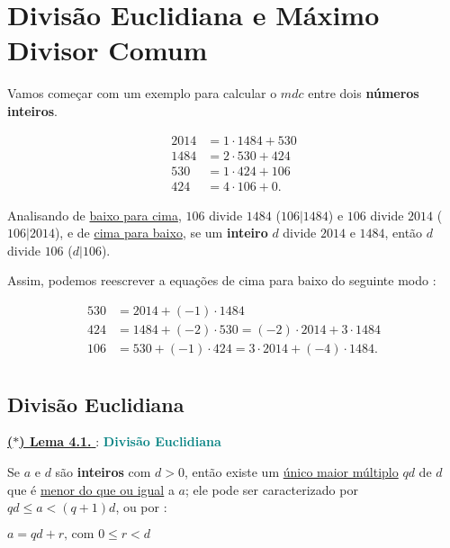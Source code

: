 \section*{Divisão Euclidiana e Máximo Divisor Comum}

Vamos começar com um exemplo para calcular o $mdc$ entre dois \textbf{números inteiros}.

\begin{exemplo}[: {$mdc(2014,1486) = 106$}]
\[
\begin{aligned}
    2014 &= 1 \cdot 1484 + 530 \\
    1484 &= 2 \cdot 530 + 424 \\
    530 &= 1 \cdot 424 + 106 \\
    424 &= 4 \cdot 106 + 0.
\end{aligned}
\]
\end{exemplo}

\noindent Analisando de \underline{baixo para cima}, $106$ divide $1484$ ($106|1484$) e $106$ divide $2014$ 
($106|2014$), e de \underline{cima para baixo}, se um \textbf{inteiro} $d$ divide $2014$ e $1484$, então $d$ divide $106$ ($d|106$).

\vspace{0.05cm}
\noindent Assim, podemos reescrever a equações de cima para baixo do seguinte modo : 

\begin{align*}
    530 &= 2014 + (-1) \cdot 1484 \\
    424 &= 1484 + (-2) \cdot 530 = (-2) \cdot 2014 + 3 \cdot 1484 \\
    106 &= 530 + (-1) \cdot 424 = 3 \cdot 2014 + (-4) \cdot 1484. \\
\end{align*}

\subsection*{Divisão Euclidiana}

\noindent\underline{\underline{\textbf{($\ast$) Lema 4.1. }}} : \textbf{\textcolor{teal}{Divisão Euclidiana}}

Se $a$ e $d$ são \textbf{inteiros} com $d > 0$, então existe um \underline{único maior múltiplo} $qd$ de $d$ que é 
\underline{menor do que ou igual} a $a$; ele pode ser caracterizado por $qd \leq a < (q + 1)d$, ou por : 
\begin{center}
    $a = qd + r \text{, com } 0 \leq r < d$
\end{center}

